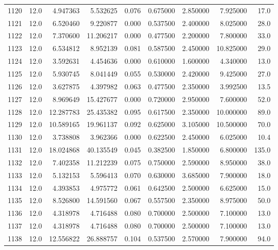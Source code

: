 \begin{tabular}{lrrrrrrrr}
1120 &   12.0 &   4.947363 &   5.532625 &  0.076 &  0.675000 &  2.850000 &   7.925000 &   17.0 \\
1121 &   12.0 &   6.520460 &   9.220877 &  0.000 &  0.537500 &  2.400000 &   8.025000 &   28.0 \\
1122 &   12.0 &   7.370600 &  11.206217 &  0.000 &  0.477500 &  2.200000 &   7.800000 &   33.0 \\
1123 &   12.0 &   6.534812 &   8.952139 &  0.081 &  0.587500 &  2.450000 &  10.825000 &   29.0 \\
1124 &   12.0 &   3.592631 &   4.454636 &  0.000 &  0.610000 &  1.600000 &   4.340000 &   13.0 \\
1125 &   12.0 &   5.930745 &   8.041449 &  0.055 &  0.530000 &  2.420000 &   9.425000 &   27.0 \\
1126 &   12.0 &   3.627875 &   4.397982 &  0.063 &  0.477500 &  2.350000 &   3.992500 &   13.5 \\
1127 &   12.0 &   8.969649 &  15.427677 &  0.000 &  0.720000 &  2.950000 &   7.600000 &   52.0 \\
1128 &   12.0 &  12.287783 &  25.435382 &  0.095 &  0.617500 &  2.350000 &  10.000000 &   89.0 \\
1129 &   12.0 &  10.589165 &  19.961137 &  0.092 &  0.625000 &  3.105000 &  10.500000 &   70.0 \\
1130 &   12.0 &   3.738808 &   3.962366 &  0.000 &  0.622500 &  2.450000 &   6.025000 &   10.4 \\
1131 &   12.0 &  18.024868 &  40.135549 &  0.045 &  0.382500 &  1.850000 &   6.800000 &  135.0 \\
1132 &   12.0 &   7.402358 &  11.212239 &  0.075 &  0.750000 &  2.590000 &   8.950000 &   38.0 \\
1133 &   12.0 &   5.132153 &   5.596413 &  0.070 &  0.630000 &  3.685000 &   7.900000 &   18.0 \\
1134 &   12.0 &   4.393853 &   4.975772 &  0.061 &  0.642500 &  2.500000 &   6.625000 &   15.0 \\
1135 &   12.0 &   8.526800 &  14.591560 &  0.067 &  0.557500 &  2.350000 &   8.975000 &   50.0 \\
1136 &   12.0 &   4.318978 &   4.716488 &  0.080 &  0.700000 &  2.500000 &   7.100000 &   13.0 \\
1137 &   12.0 &   4.318978 &   4.716488 &  0.080 &  0.700000 &  2.500000 &   7.100000 &   13.0 \\
1138 &   12.0 &  12.556822 &  26.888757 &  0.104 &  0.537500 &  2.570000 &   7.900000 &   94.0 \\

\end{tabular}
